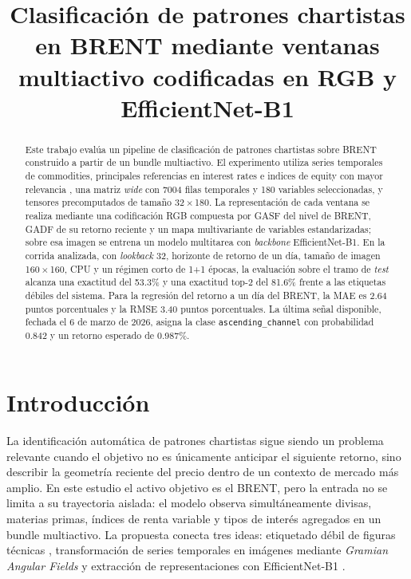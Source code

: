 \documentclass[11pt,a4paper]{article}
\title{Clasificación de patrones chartistas en BRENT mediante ventanas multiactivo codificadas en RGB y EfficientNet-B1}
\author{}
\date{}
\begin{document}
\maketitle

\begin{abstract}
Este trabajo evalúa un pipeline de clasificación de patrones chartistas sobre BRENT construido a partir de un bundle multiactivo. El experimento utiliza series temporales de commodities, principales referencias en interest rates e indices de equity con mayor relevancia , una matriz \emph{wide} con 7004 filas temporales y 180 variables seleccionadas, y tensores precomputados de tamaño 32\,$\times$\,180. La representación de cada ventana se realiza mediante una codificación RGB compuesta por GASF del nivel de BRENT, GADF de su retorno reciente y un mapa multivariante de variables estandarizadas; sobre esa imagen se entrena un modelo multitarea con \emph{backbone} EfficientNet-B1. En la corrida analizada, con \emph{lookback} 32, horizonte de retorno de un día, tamaño de imagen 160\,$\times$\,160, CPU y un régimen corto de 1+1 épocas, la evaluación sobre el tramo de \emph{test} alcanza una exactitud del 53.3\% y una exactitud top-2 del 81.6\% frente a las etiquetas débiles del sistema. Para la regresión del retorno a un día del BRENT, la MAE es 2.64 puntos porcentuales y la RMSE 3.40 puntos porcentuales. La última señal disponible, fechada el 6 de marzo de 2026, asigna la clase \texttt{ascending\_channel} con probabilidad 0.842 y un retorno esperado de 0.987\%.
\end{abstract}

\section{Introducción}
La identificación automática de patrones chartistas sigue siendo un problema relevante cuando el objetivo no es únicamente anticipar el siguiente retorno, sino describir la geometría reciente del precio dentro de un contexto de mercado más amplio. En este estudio el activo objetivo es el BRENT, pero la entrada no se limita a su trayectoria aislada: el modelo observa simultáneamente divisas, materias primas, índices de renta variable y tipos de interés agregados en un bundle multiactivo. La propuesta conecta tres ideas: etiquetado débil de figuras técnicas \cite{lo2000foundations}, transformación de series temporales en imágenes mediante \emph{Gramian Angular Fields} \cite{wang2015imaging} y extracción de representaciones con EfficientNet-B1 \cite{tan2019efficientnet}.
\end{document}
